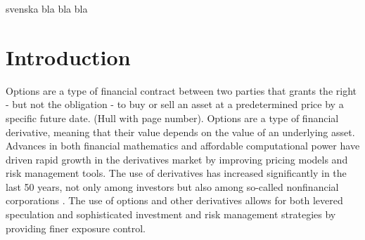 \documentclass[english,12pt,a4paper,pdftex,sci,utf8]{aaltothesis}
\begin{document}
\newpage
%

\newpage
%
%
\begin{abstractpage}[swedish]
 svenska bla bla bla
\end{abstractpage}

\newpage



\thesistableofcontents




\cleardoublepage
\storeinipagenumber
{}
\setcounter{page}{1}


\section{Introduction}

\thispagestyle{empty}
Options are a type of financial contract between two parties that grants the right - but not the obligation - to buy or sell an asset at a predetermined price by a specific future date. (Hull with page number). Options are a type of financial derivative, meaning that their value depends on the value of an underlying asset. Advances in both financial mathematics \cite{merton1994influence} and affordable computational power \cite{nordhaus2007two} have driven rapid growth in the derivatives market by improving pricing models and risk management tools. The use of derivatives has increased significantly in the last 50 years, not only among investors but also among so-called nonfinancial corporations \cite{bartram2009international}. The use of options and other derivatives allows for both levered speculation and sophisticated investment and risk management strategies by providing finer exposure control.
\end{document}
